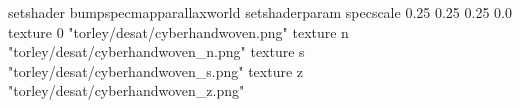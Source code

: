 setshader bumpspecmapparallaxworld
setshaderparam specscale 0.25 0.25 0.25 0.0
texture 0 "torley/desat/cyberhandwoven.png"
texture n "torley/desat/cyberhandwoven_n.png"
texture s "torley/desat/cyberhandwoven_s.png"
texture z "torley/desat/cyberhandwoven_z.png"

